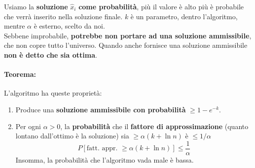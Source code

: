 Usiamo la \textbf{soluzione} $\hat x_i$ \textbf{come probabilità}, più il valore è alto più è probabile che verrà inserito nella soluzione finale. $k$ è un parametro, dentro l'algoritmo, mentre $\alpha$ è esterno, scelto da noi.\\

Sebbene improbabile, \textbf{potrebbe non portare ad una soluzione ammissibile}, che non copre tutto l'universo. Quando anche fornisce una soluzione ammissibile \textbf{non è detto che sia ottima}.\\

\newpage

\paragraph{Teorema:} L'algoritmo ha queste proprietà:
\begin{enumerate}
	\item Produce una \textbf{soluzione ammissibile con probabilità} $\geq 1 - e^{-k}$.\\
	
	\item Per ogni $\alpha > 0$, la \textbf{probabilità} che il \textbf{fattore di approssimazione} (quanto lontano dall'ottimo è la soluzione) sia $\geq \alpha (k + \ln n)$ è $\leq 1/\alpha$
	$$ P[\text{fatt. appr. } \geq \alpha (k + \ln n)] \leq \frac{1}{\alpha} $$
	Insomma, la probabilità che l'algoritmo vada male è bassa.\\
\end{enumerate}

